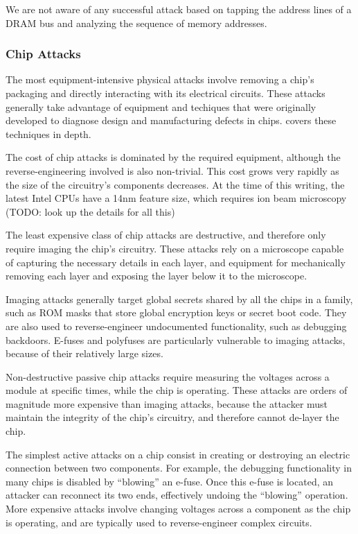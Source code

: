 We are not aware of any successful attack based on tapping the address lines of
a DRAM bus and analyzing the sequence of memory addresses.


\subsubsection{Chip Attacks}
\label{sec:physical_chip_attacks}

The most equipment-intensive physical attacks involve removing a chip's
packaging and directly interacting with its electrical circuits. These attacks
generally take advantage of equipment and techiques that were originally
developed to diagnose design and manufacturing defects in chips.
\cite{beck1998integrated} covers these techniques in depth.

The cost of chip attacks is dominated by the required equipment, although the
reverse-engineering involved is also non-trivial. This cost grows very rapidly
as the size of the circuitry's components decreases. At the time of this
writing, the latest Intel CPUs have a 14nm feature size, which requires ion
beam microscopy (TODO: look up the details for all this)

The least expensive class of chip attacks are destructive, and therefore only
require imaging the chip's circuitry. These attacks rely on a microscope
capable of capturing the necessary details in each layer, and equipment for
mechanically removing each layer and exposing the layer below it to the
microscope.

Imaging attacks generally target global secrets shared by all the chips in a
family, such as ROM masks that store global encryption keys or secret boot
code. They are also used to reverse-engineer undocumented functionality, such
as debugging backdoors. E-fuses and polyfuses are particularly vulnerable to
imaging attacks, because of their relatively large sizes.

Non-destructive passive chip attacks require measuring the voltages across a
module at specific times, while the chip is operating. These attacks are orders
of magnitude more expensive than imaging attacks, because the attacker must
maintain the integrity of the chip's circuitry, and therefore cannot de-layer
the chip.

The simplest active attacks on a chip consist in creating or destroying an
electric connection between two components. For example, the debugging
functionality in many chips is disabled by ``blowing'' an e-fuse. Once this
e-fuse is located, an attacker can reconnect its two ends, effectively undoing
the ``blowing'' operation. More expensive attacks involve changing voltages
across a component as the chip is operating, and are typically used to
reverse-engineer complex circuits.

